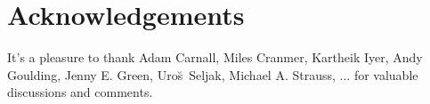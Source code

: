 \documentclass[12pt, letterpaper, preprint, comicneue]{aastex63}
\begin{document}








\section*{Acknowledgements}
It's a pleasure to thank 
    Adam Carnall, 
    Miles Cranmer, 
    Kartheik Iyer,
    Andy Goulding,
    Jenny E. Green,
    Uro{\u s}~Seljak,
    Michael A. Strauss, 
    ...
for valuable discussions and comments.

\appendix
%
 
\end{document}
